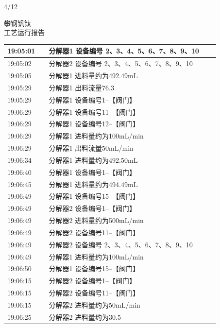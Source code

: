 \documentclass[UTF8,10pt,a4paper,fontset=fandol]{ctexart}
\newcommand{\handwritten}[1]{#1}
\begin{document}
\vfill
\begin{flushright}
\handwritten{4/12}
\end{flushright}


\newpage

\noindent
\begin{minipage}[t]{0.48\linewidth}
\centering
{\small 攀钢钒钛}\\[-1mm]
工艺运行报告

\vspace{2mm}
{\scriptsize
\begin{tabular}{|p{0.18\linewidth}|p{0.74\linewidth}|}
\hline
19:05:01 & 分解器1 设备编号 2、3、4、5、6、7、8、9、10 \\ \hline
19:05:02 & 分解器2 设备编号 2、3、4、5、6、7、8、9、10 \\ \hline
19:05:05 & 分解器1 进料量约为492.49mL \\ \hline
19:05:29 & 分解器1 出料流量76.3 \\ \hline
19:05:29 & 分解器1 设备编号1--【阀门】 \\ \hline
19:06:29 & 分解器1 设备编号11--【阀门】 \\ \hline
19:06:29 & 分解器1 设备编号12--【阀门】 \\ \hline
19:06:29 & 分解器1 进料量约为100mL/min \\ \hline
19:06:29 & 分解器1 出料流量50mL/min \\ \hline
19:06:34 & 分解器1 进料量约为492.50mL \\ \hline
19:06:40 & 分解器1 设备编号1--【阀门】 \\ \hline
19:06:45 & 分解器1 进料量约为494.49mL \\ \hline
19:06:49 & 分解器1 设备编号15--【阀门】 \\ \hline
19:06:49 & 分解器2 设备编号1--【阀门】 \\ \hline
19:06:49 & 分解器2 进料量约为500mL/min \\ \hline
19:06:49 & 分解器2 设备编号11--【阀门】 \\ \hline
19:06:49 & 分解器2 设备编号 2、3、4、5、6、7、8、9、10 \\ \hline
19:06:49 & 分解器1 进料量约为100mL/min \\ \hline
19:06:50 & 分解器1 设备编号15--【阀门】 \\ \hline
19:06:15 & 分解器2 设备编号1--【阀门】 \\ \hline
19:06:15 & 分解器2 设备编号11--【阀门】 \\ \hline
19:06:15 & 分解器2 进料量约为50mL/min \\ \hline
19:06:25 & 分解器2 进料量约为30.5 \\ \hline
\end{tabular}}
\end{minipage}
\end{document}
